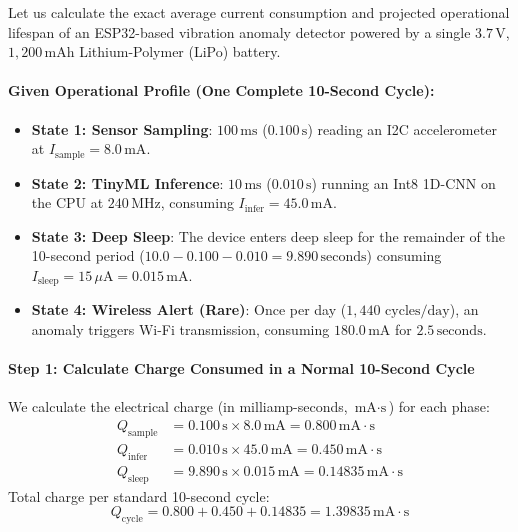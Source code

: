 \begin{example}
Let us calculate the exact average current consumption and projected operational lifespan of an ESP32-based vibration anomaly detector powered by a single $3.7\,\text{V}$, $1{,}200\,\text{mAh}$ Lithium-Polymer (LiPo) battery.

\paragraph{Given Operational Profile (One Complete 10-Second Cycle):}
\begin{itemize}
    \item \textbf{State 1: Sensor Sampling}: $100\,\text{ms}$ ($0.100\,\text{s}$) reading an I2C accelerometer at $I_{\text{sample}} = 8.0\,\text{mA}$.
    \item \textbf{State 2: TinyML Inference}: $10\,\text{ms}$ ($0.010\,\text{s}$) running an Int8 1D-CNN on the CPU at $240\,\text{MHz}$, consuming $I_{\text{infer}} = 45.0\,\text{mA}$.
    \item \textbf{State 3: Deep Sleep}: The device enters deep sleep for the remainder of the 10-second period ($10.0 - 0.100 - 0.010 = 9.890\,\text{seconds}$) consuming $I_{\text{sleep}} = 15\,\mu\text{A} = 0.015\,\text{mA}$.
    \item \textbf{State 4: Wireless Alert (Rare)}: Once per day ($1{,}440 \text{ cycles/day}$), an anomaly triggers Wi-Fi transmission, consuming $180.0\,\text{mA}$ for $2.5\,\text{seconds}$.
\end{itemize}

\paragraph{Step 1: Calculate Charge Consumed in a Normal 10-Second Cycle}
We calculate the electrical charge (in milliamp-seconds, $\text{mA}\cdot\text{s}$) for each phase:
\begin{align*}
Q_{\text{sample}} &= 0.100\,\text{s} \times 8.0\,\text{mA} = 0.800\,\text{mA}\cdot\text{s}\\
Q_{\text{infer}}  &= 0.010\,\text{s} \times 45.0\,\text{mA} = 0.450\,\text{mA}\cdot\text{s}\\
Q_{\text{sleep}}  &= 9.890\,\text{s} \times 0.015\,\text{mA} = 0.14835\,\text{mA}\cdot\text{s}
\end{align*}
Total charge per standard 10-second cycle:
\begin{equation*}
Q_{\text{cycle}} = 0.800 + 0.450 + 0.14835 = 1.39835\,\text{mA}\cdot\text{s}
\end{equation*}


\end{example}
